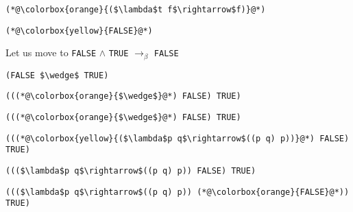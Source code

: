 \documentclass{beamer}
\begin{document}
\begin{frame}[fragile]{\CurrentSection}
\lstset{basicstyle=\ttfamily\small}\lstset{numbers=none}\lstset{language=ML}\begin{lstlisting}
(*@\colorbox{orange}{($\lambda$t f$\rightarrow$f)}@*)
\end{lstlisting}
\pause\lstset{language=ML}\begin{lstlisting}
(*@\colorbox{yellow}{FALSE}@*)
\end{lstlisting}

\end{frame}

\begin{frame}[fragile]{\CurrentSection}
\begin{block}{\CurrentSubSection}
Let us move to \texttt{FALSE} $\wedge$ \texttt{TRUE} $\rightarrow_\beta$ \texttt{FALSE}
\end{block}


\end{frame}

\begin{frame}[fragile]{\CurrentSection}
\lstset{basicstyle=\ttfamily\small}\lstset{numbers=none}\lstset{language=ML}\begin{lstlisting}
(FALSE $\wedge$ TRUE)
\end{lstlisting}
\pause\lstset{language=ML}\begin{lstlisting}
(((*@\colorbox{orange}{$\wedge$}@*) FALSE) TRUE)
\end{lstlisting}

\end{frame}

\begin{frame}[fragile]{\CurrentSection}
\lstset{basicstyle=\ttfamily\small}\lstset{numbers=none}\lstset{language=ML}\begin{lstlisting}
(((*@\colorbox{orange}{$\wedge$}@*) FALSE) TRUE)
\end{lstlisting}
\pause\lstset{language=ML}\begin{lstlisting}
(((*@\colorbox{yellow}{($\lambda$p q$\rightarrow$((p q) p))}@*) FALSE) TRUE)
\end{lstlisting}

\end{frame}

\begin{frame}[fragile]{\CurrentSection}
\lstset{basicstyle=\ttfamily\small}\lstset{numbers=none}\lstset{language=ML}\begin{lstlisting}
((($\lambda$p q$\rightarrow$((p q) p)) FALSE) TRUE)
\end{lstlisting}
\pause\lstset{language=ML}\begin{lstlisting}
((($\lambda$p q$\rightarrow$((p q) p)) (*@\colorbox{orange}{FALSE}@*)) TRUE)
\end{lstlisting}

\end{frame}
\end{document}
